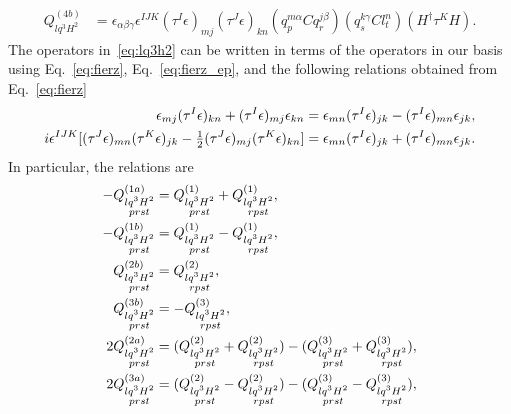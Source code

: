 \begin{enumerate}
\begin{align}
%
Q_{lq^3H^2}^{(4b)} &= \epsilon_{\alpha\beta\gamma} \epsilon^{IJK} (\tau^I \epsilon)_{mj} (\tau^J \epsilon)_{kn} (q_p^{m\alpha} C q_r^{j\beta}) (q_s^{k\gamma} C l_t^n) (H^\dag \tau^K H) .
\end{align}
The operators in~\eqref{eq:lq3h2} can be written in terms of the operators in our basis using Eq.~\eqref{eq:fierz}, Eq.~\eqref{eq:fierz_ep}, and the following relations obtained from Eq.~\eqref{eq:fierz}
\begin{align}
\epsilon_{mj} (\tau^I \epsilon)_{kn} + (\tau^I \epsilon)_{mj} \epsilon_{kn} &= \epsilon_{mn} (\tau^I \epsilon)_{jk} - (\tau^I \epsilon)_{mn} \epsilon_{jk} , \nonumber\\ 
i \epsilon^{IJK} [(\tau^J \epsilon)_{mn} (\tau^K \epsilon)_{jk} - \tfrac{1}{2} (\tau^J \epsilon)_{mj} (\tau^K \epsilon)_{kn}] &= \epsilon_{mn} (\tau^I \epsilon)_{jk} + (\tau^I \epsilon)_{mn} \epsilon_{jk} .
\end{align} 
In particular, the relations are
\begin{align}
- Q_{\substack{lq^3H^2 \\ prst}}^{(1a)} &= Q_{\substack{lq^3H^2 \\ prst}}^{(1)} + Q_{\substack{lq^3H^2 \\ rpst}}^{(1)} , \nn
- Q_{\substack{lq^3H^2 \\ prst}}^{(1b)} &= Q_{\substack{lq^3H^2 \\ prst}}^{(1)} - Q_{\substack{lq^3H^2 \\ rpst}}^{(1)} , \nn
%
Q_{\substack{lq^3H^2 \\ prst}}^{(2b)} &= Q_{\substack{lq^3H^2 \\ rpst}}^{(2)} , \nn
Q_{\substack{lq^3H^2 \\ prst}}^{(3b)} &= - Q_{\substack{lq^3H^2 \\ rpst}}^{(3)} , \nn
%
2 Q_{\substack{lq^3H^2 \\ prst}}^{(2a)} &= (Q_{\substack{lq^3H^2 \\ prst}}^{(2)} + Q_{\substack{lq^3H^2 \\ rpst}}^{(2)}) - (Q_{\substack{lq^3H^2 \\ prst}}^{(3)} + Q_{\substack{lq^3H^2 \\ rpst}}^{(3)}) , \nn
%
2 Q_{\substack{lq^3H^2 \\ prst}}^{(3a)} &= (Q_{\substack{lq^3H^2 \\ prst}}^{(2)} - Q_{\substack{lq^3H^2 \\ rpst}}^{(2)}) - (Q_{\substack{lq^3H^2 \\ prst}}^{(3)} - Q_{\substack{lq^3H^2 \\ rpst}}^{(3)}) , \nn

\end{align}
\end{enumerate}
